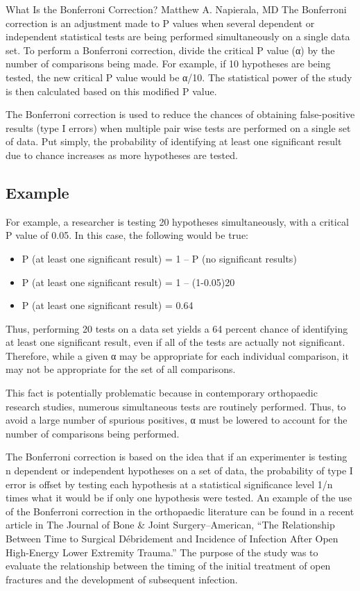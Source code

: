 What Is the Bonferroni Correction?
Matthew A. Napierala, MD
The Bonferroni correction is an adjustment made to P values when several dependent or independent statistical tests are being performed simultaneously on a single data set. To perform a Bonferroni correction, divide the critical P value (α) by the number of comparisons being made. For example, if 10 hypotheses are being tested, the new critical P value would be α/10. The statistical power of the study is then calculated based on this modified P value.

The Bonferroni correction is used to reduce the chances of obtaining false-positive results (type I errors) when multiple pair wise tests are performed on a single set of data. Put simply, the probability of identifying at least one significant result due to chance increases as more hypotheses are tested.
\subsection*{Example}
For example, a researcher is testing 20 hypotheses simultaneously, with a critical P value of 0.05. In this case, the following would be true:

\begin{itemize}
\item P (at least one significant result) = 1 – P (no significant results)
\item P (at least one significant result) = 1 – (1-0.05)20
\item P (at least one significant result) = 0.64
\end{itemize}
Thus, performing 20 tests on a data set yields a 64 percent chance of identifying at least one significant result, even if all of the tests are actually not significant. Therefore, while a given α may be appropriate for each individual comparison, it may not be appropriate for the set of all comparisons.

This fact is potentially problematic because in contemporary orthopaedic research studies, numerous simultaneous tests are routinely performed. Thus, to avoid a large number of spurious positives, α must be lowered to account for the number of comparisons being performed.

The Bonferroni correction is based on the idea that if an experimenter is testing n dependent or independent hypotheses on a set of data, the probability of type I error is offset by testing each hypothesis at a statistical significance level 1/n times what it would be if only one hypothesis were tested.
An example of the use of the Bonferroni correction in the orthopaedic literature can be found in a recent article in The Journal of Bone & Joint Surgery–American, “The Relationship Between Time to Surgical Débridement and Incidence of Infection After Open High-Energy Lower Extremity Trauma.” The purpose of the study was to evaluate the relationship between the timing of the initial treatment of open fractures and the development of subsequent infection.

